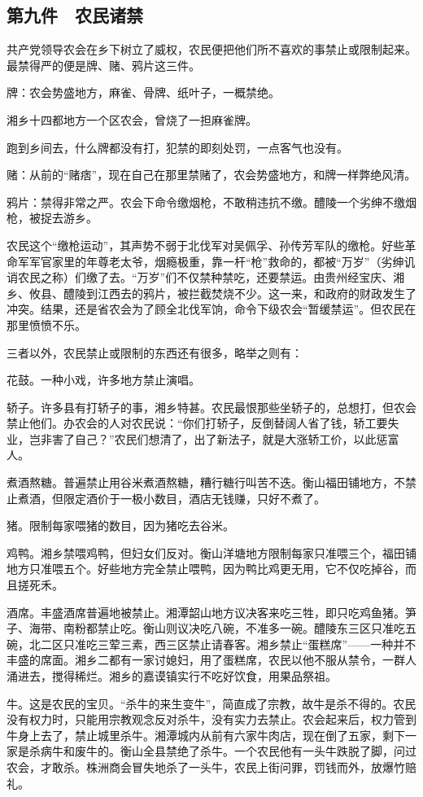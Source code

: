 \subsection*{第九件　农民诸禁}

共产党领导农会在乡下树立了威权，农民便把他们所不喜欢的事禁止或限制起来。最禁得严的便是牌、赌、鸦片这三件。

牌：农会势盛地方，麻雀、骨牌、纸叶子，一概禁绝。

湘乡十四都地方一个区农会，曾烧了一担麻雀牌。

跑到乡间去，什么牌都没有打，犯禁的即刻处罚，一点客气也没有。

赌：从前的“赌痞”，现在自己在那里禁赌了，农会势盛地方，和牌一样弊绝风清。

鸦片：禁得非常之严。农会下命令缴烟枪，不敢稍违抗不缴。醴陵一个劣绅不缴烟枪，被捉去游乡。

农民这个“缴枪运动”，其声势不弱于北伐军对吴佩孚、孙传芳军队的缴枪。好些革命军军官家里的年尊老太爷，烟瘾极重，靠一杆“枪”救命的，都被“万岁”（劣绅讥诮农民之称）们缴了去。“万岁”们不仅禁种禁吃，还要禁运。由贵州经宝庆、湘乡、攸县、醴陵到江西去的鸦片，被拦截焚烧不少。这一来，和政府的财政发生了冲突。结果，还是省农会为了顾全北伐军饷，命令下级农会“暂缓禁运”。但农民在那里愤愤不乐。

三者以外，农民禁止或限制的东西还有很多，略举之则有：

花鼓。一种小戏，许多地方禁止演唱。

轿子。许多县有打轿子的事，湘乡特甚。农民最恨那些坐轿子的，总想打，但农会禁止他们。办农会的人对农民说：“你们打轿子，反倒替阔人省了钱，轿工要失业，岂非害了自己？”农民们想清了，出了新法子，就是大涨轿工价，以此惩富人。

煮酒熬糖。普遍禁止用谷米煮酒熬糖，糟行糖行叫苦不迭。衡山福田铺地方，不禁止煮酒，但限定酒价于一极小数目，酒店无钱赚，只好不煮了。

猪。限制每家喂猪的数目，因为猪吃去谷米。

鸡鸭。湘乡禁喂鸡鸭，但妇女们反对。衡山洋塘地方限制每家只准喂三个，福田铺地方只准喂五个。好些地方完全禁止喂鸭，因为鸭比鸡更无用，它不仅吃掉谷，而且搓死禾。

酒席。丰盛酒席普遍地被禁止。湘潭韶山地方议决客来吃三牲，即只吃鸡鱼猪。笋子、海带、南粉都禁止吃。衡山则议决吃八碗，不准多一碗。醴陵东三区只准吃五碗，北二区只准吃三荤三素，西三区禁止请春客。湘乡禁止“蛋糕席”——一种并不丰盛的席面。湘乡二都有一家讨媳妇，用了蛋糕席，农民以他不服从禁令，一群人涌进去，搅得稀烂。湘乡的嘉谟镇实行不吃好饮食，用果品祭祖。

牛。这是农民的宝贝。“杀牛的来生变牛”，简直成了宗教，故牛是杀不得的。农民没有权力时，只能用宗教观念反对杀牛，没有实力去禁止。农会起来后，权力管到牛身上去了，禁止城里杀牛。湘潭城内从前有六家牛肉店，现在倒了五家，剩下一家是杀病牛和废牛的。衡山全县禁绝了杀牛。一个农民他有一头牛跌脱了脚，问过农会，才敢杀。株洲商会冒失地杀了一头牛，农民上街问罪，罚钱而外，放爆竹赔礼。

